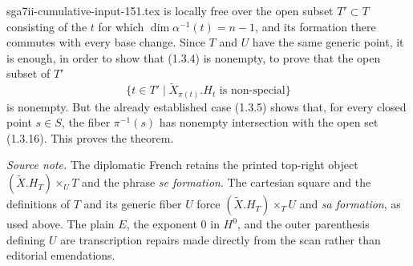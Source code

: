 \begin{filecontents*}{sga7ii-cumulative-input-151.tex}
is locally free over the open subset $T'\subset T$ consisting of the
$t$ for which $\dim\alpha^{-1}(t)=n-1$, and its formation there commutes
with every base change.  Since $T$ and $U$ have the same generic point, it
is enough, in order to show that (1.3.4) is nonempty, to prove that the open
subset of $T'$
\begin{equation}\tag{1.3.16}
\bigl\{t\in T'\mid\widetilde X_{\pi(t)}.H_t
   \text{ is non-special}\bigr\}
\end{equation}
is nonempty.  But the already established case (1.3.5) shows that, for
every closed point $s\in S$, the fiber $\pi^{-1}(s)$ has nonempty
intersection with the open set (1.3.16).  This proves the theorem.

\medskip
\noindent\emph{Source note.}
The diplomatic French retains the printed top-right object
$(\widetilde X.H_T)\times_U T$ and the phrase \emph{se formation}.
The cartesian square and the definitions of $T$ and its generic fiber $U$
force $(\widetilde X.H_T)\times_T U$ and \emph{sa formation}, as used above.
The plain $E$, the exponent $0$ in $H^0$, and the outer parenthesis defining
$U$ are transcription repairs made directly from the scan rather than
editorial emendations.
\end{filecontents*}
